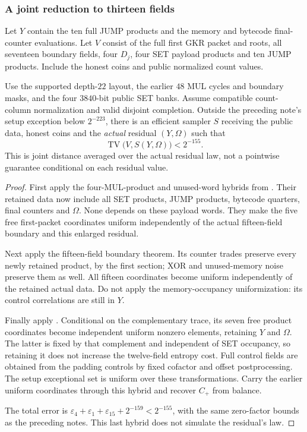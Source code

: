 \subsubsection{A joint reduction to thirteen fields}

Let $Y$ contain the ten full JUMP products and the memory and bytecode final-counter evaluations. Let $V$ consist of the full first GKR packet and roots, all seventeen boundary fields, four $D_j$, four SET payload products and ten JUMP products. Include the honest coins and public normalized count values.

\begin{proposition}
Use the supported depth-$22$ layout, the earlier $48$ MUL cycles and boundary masks, and the four $3840$-bit public SET banks. Assume compatible count-column normalization and valid disjoint completion. Outside the preceding note's setup exception below $2^{-223}$, there is an efficient sampler $S$ receiving the public data, honest coins and the \emph{actual} residual $(Y,\Omega)$ such that
\[
 \operatorname{TV}\bigl(V,S(Y,\Omega)\bigr)<2^{-155}.
\]
This is joint distance averaged over the actual residual law, not a pointwise guarantee conditional on each residual value.
\end{proposition}
\begin{proof}
First apply the four-MUL-product and unused-word hybrids from . Their retained data now include all SET products, JUMP products, bytecode quarters, final counters and $\Omega$. None depends on these payload words. They make the five free first-packet coordinates uniform independently of the actual fifteen-field boundary and this enlarged residual.

Next apply the fifteen-field boundary theorem. Its counter trades preserve every newly retained product, by the first section; XOR and unused-memory noise preserve them as well. All fifteen coordinates become uniform independently of the retained actual data. Do not apply the memory-occupancy uniformization: its control correlations are still in $Y$.

Finally apply . Conditional on the complementary trace, its seven free product coordinates become independent uniform nonzero elements, retaining $Y$ and $\Omega$. The latter is fixed by that complement and independent of SET occupancy, so retaining it does not increase the twelve-field entropy cost. Full control fields are obtained from the padding controls by fixed cofactor and offset postprocessing. The setup exceptional set is uniform over these transformations. Carry the earlier uniform coordinates through this hybrid and recover $C_+$ from balance.

The total error is $\varepsilon_4+\varepsilon_1+\varepsilon_{15}+2^{-159}<2^{-155}$, with the same zero-factor bounds as the preceding notes. This last hybrid does not simulate the residual's law.
\end{proof}

